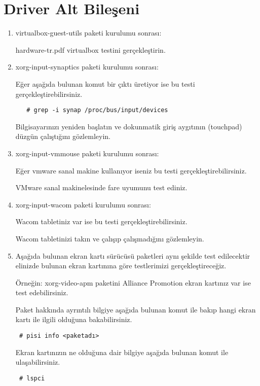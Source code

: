 \documentclass[a4paper,10pt]{article}
\begin{document}
\section{Driver Alt Bileşeni}
\begin{enumerate}
  \item virtualbox-guest-utils paketi kurulumu sonrası:

hardware-tr.pdf virtualbox testini gerçekleştirin.

  \item xorg-input-synaptics  paketi kurulumu sonrası:

Eğer aşağıda bulunan komut bir çıktı üretiyor ise bu testi gerçekleştirebilirsiniz.
  \begin{verbatim}
   # grep -i synap /proc/bus/input/devices
  \end{verbatim}

Bilgisayarınızı yeniden başlatın ve dokunmatik giriş aygıtının (touchpad) düzgün çalıştığını gözlemleyin.

\item xorg-input-vmmouse paketi kurulumu sonrası:

Eğer vmware sanal makine kullanıyor iseniz bu testi gerçekleştirebilirsiniz. 

VMware sanal makinelesinde fare uyumunu test ediniz.

\item xorg-input-wacom paketi kurulumu sonrası:

Wacom tabletiniz var ise bu testi gerçekleştirebilirsiniz.

Wacom tabletinizi takın ve çalışıp çalışmadığını gözlemleyin.

\item Aşağıda bulunan ekran kartı sürücüsü paketleri aynı şekilde test edilecektir elinizde bulunan ekran kartınına göre testlerimizi gerçekleştireceğiz. 

Örneğin: xorg-video-apm paketini Alliance Promotion ekran kartınız var ise test edebilirsiniz.

Paket hakkında ayrıntılı bilgiye aşağıda bulunan komut ile bakıp hangi ekran kartı ile ilgili olduğuna bakabilirsiniz.
\begin{verbatim}
 # pisi info <paketadı>
\end{verbatim}

Ekran kartınızın ne olduğuna dair bilgiye aşağıda bulunan komut ile ulaşabilirsiniz.
\begin{verbatim}
 # lspci
\end{verbatim}


\end{enumerate}
\end{document}
